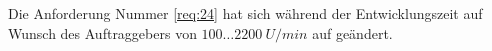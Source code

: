 \documentclass[./\jobname.tex]{subfiles}
\begin{document}
%
Die Anforderung Nummer \ref{req:24} hat sich während der Entwicklungszeit auf Wunsch des Auftraggebers von \(100\ldots2200~U/min\) auf \minMaxVelocity geändert.
%
%			
%
%
\end{document}
